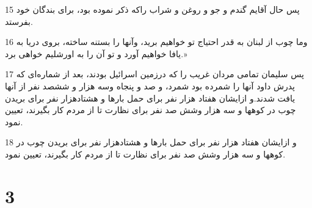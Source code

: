 \par 15 پس حال آقایم گندم و جو و روغن و شراب راکه ذکر نموده بود، برای بندگان خود بفرستد.
\par 16 وما چوب از لبنان به قدر احتیاج تو خواهیم برید، وآنها را بستنه ساخته، بروی دریا به یافا خواهیم آورد و تو آن را به اورشلیم خواهی برد.»
\par 17 پس سلیمان تمامی مردان غریب را که درزمین اسرائیل بودند، بعد از شماره‌ای که پدرش داود آنها را شمرده بود شمرد، و صد و پنجاه وسه هزار و ششصد نفر از آنها یافت شدند.و ازایشان هفتاد هزار نفر برای حمل بارها و هشتادهزار نفر برای بریدن چوب در کوهها و سه هزار وشش صد نفر برای نظارت تا از مردم کار بگیرند، تعیین نمود.
\par 18 و ازایشان هفتاد هزار نفر برای حمل بارها و هشتادهزار نفر برای بریدن چوب در کوهها و سه هزار وشش صد نفر برای نظارت تا از مردم کار بگیرند، تعیین نمود.
 
\chapter{3}

